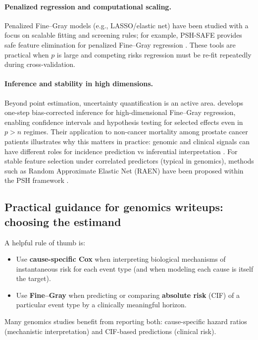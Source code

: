 \documentclass[11pt]{article}
\begin{document}
\paragraph{Penalized regression and computational scaling.}
Penalized Fine--Gray models (e.g., LASSO/elastic net) have been studied with a focus on scalable fitting and screening rules; for example, PSH-SAFE provides safe feature elimination for penalized Fine--Gray regression \citep{PSHSAFE2022}. These tools are practical when $p$ is large and competing risks regression must be re-fit repeatedly during cross-validation.

\paragraph{Inference and stability in high dimensions.}
Beyond point estimation, uncertainty quantification is an active area. \citet{HouBradicXu2019EJS} develops one-step bias-corrected inference for high-dimensional Fine--Gray regression, enabling confidence intervals and hypothesis testing for selected effects even in $p>n$ regimes. Their application to non-cancer mortality among prostate cancer patients illustrates why this matters in practice: genomic and clinical signals can have different roles for incidence prediction vs inferential interpretation \citep{HouBradicXu2019EJS}. For stable feature selection under correlated predictors (typical in genomics), methods such as Random Approximate Elastic Net (RAEN) have been proposed within the PSH framework \citep{RAEN2023}.

\subsection{Practical guidance for genomics writeups: choosing the estimand}\label{sec:practical-guide}
A helpful rule of thumb is:
\begin{itemize}
  \item Use \textbf{cause-specific Cox} when interpreting biological mechanisms of instantaneous risk for each event type (and when modeling each cause is itself the target).
  \item Use \textbf{Fine--Gray} when predicting or comparing \textbf{absolute risk} (CIF) of a particular event type by a clinically meaningful horizon.
\end{itemize}
Many genomics studies benefit from reporting both: cause-specific hazard ratios (mechanistic interpretation) and CIF-based predictions (clinical risk).
\end{document}
